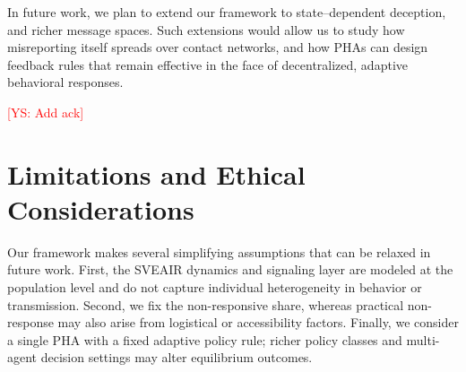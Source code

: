 \documentclass[sigconf,review]{acmart}
\newcommand{\ys}[1]{\textcolor{red}{[YS: #1]}}
\begin{document}
In future work, we plan to extend our framework to state--dependent deception, and richer message spaces. %
Such extensions would allow us to study how misreporting itself spreads over contact networks, and how PHAs can design feedback rules that remain effective in the face of decentralized, adaptive behavioral responses.







\begin{acks}
\ys{Add ack}
\end{acks}


\section*{Limitations and Ethical Considerations}

Our framework makes several simplifying assumptions that can be relaxed in future work. First, the SVEAIR dynamics and signaling layer are modeled at the population level and do not capture individual heterogeneity in behavior or transmission. Second, we fix the non-responsive share, whereas practical non-response may also arise from logistical or accessibility factors. Finally, we consider a single PHA with a fixed adaptive policy rule; richer policy classes and multi-agent decision settings may alter equilibrium outcomes.
\end{document}
